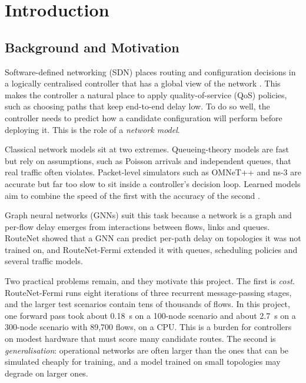 \chapter{Introduction}
\label{ch:intro}

\section{Background and Motivation}
\label{sec:background}

Software-defined networking (SDN) places routing and configuration decisions in a logically centralised controller that has a global view of the network \cite{kreutz2015sdn,mckeown2008openflow}. This makes the controller a natural place to apply quality-of-service (QoS) policies, such as choosing paths that keep end-to-end delay low. To do so well, the controller needs to predict how a candidate configuration will perform before deploying it. This is the role of a \emph{network model}.

Classical network models sit at two extremes. Queueing-theory models \cite{kleinrock1975queueing} are fast but rely on assumptions, such as Poisson arrivals and independent queues, that real traffic often violates. Packet-level simulators such as OMNeT++ \cite{varga2001omnet} and ns-3 \cite{riley2010ns3} are accurate but far too slow to sit inside a controller's decision loop. Learned models aim to combine the speed of the first with the accuracy of the second \cite{mestres2017kdn}.

Graph neural networks (GNNs) \cite{scarselli2009gnn,gilmer2017mpnn} suit this task because a network is a graph and per-flow delay emerges from interactions between flows, links and queues. RouteNet \cite{rusek2020routenet} showed that a GNN can predict per-path delay on topologies it was not trained on, and RouteNet-Fermi \cite{ferriolgalmes2023routenetfermi} extended it with queues, scheduling policies and several traffic models.

Two practical problems remain, and they motivate this project. The first is \emph{cost}. RouteNet-Fermi runs eight iterations of three recurrent message-passing stages, and the larger test scenarios contain tens of thousands of flows. In this project, one forward pass took about 0.18~s on a 100-node scenario and about 2.7~s on a 300-node scenario with 89,700 flows, on a CPU. This is a burden for controllers on modest hardware that must score many candidate routes. The second is \emph{generalisation}: operational networks are often larger than the ones that can be simulated cheaply for training, and a model trained on small topologies may degrade on larger ones.


